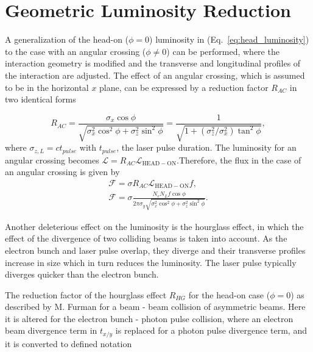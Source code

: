 \documentclass[../main.tex]{subfiles}
\begin{document}
\section{Geometric Luminosity Reduction}
\label{sec:geometric_luminosity_reduction}

A generalization of the head-on ($\phi = 0$) luminosity in (Eq.~\ref{eq:head_luminosity}) to the case with an angular crossing ($\phi \neq 0$) can be performed, where the interaction geometry is modified and the transverse and longitudinal profiles of the interaction are adjusted. The effect of an angular crossing, which is assumed to be in the horizontal $x$ plane, can be expressed by a reduction factor $R_{AC}$ in two identical forms \cite{suzuki1976general,miyahara2008luminosity}

\begin{equation}
R_{AC} = \frac{\sigma_{x}\cos\phi}{\sqrt{\sigma_{x}^{2}\cos^{2}\phi+\sigma_{z}^{2}\sin^{2}\phi}} = \frac{1}{\sqrt{1+\left(\sigma_{z}^{2}/\sigma_{x}^{2}\right)\tan^{2}\phi}},
\label{eq:angular_crossing_factor}    
\end{equation}
where $\sigma_{z,L} = ct_{pulse}$ with $t_{pulse}$, the laser pulse duration. The luminosity for an angular crossing becomes $\mathcal{L} = R_{AC}\mathcal{L}_{\mathrm{HEAD-ON}}$.Therefore, the flux in the case of an angular crossing is given by 
\begin{gather}
\mathcal{F} = \sigma R_{AC}\mathcal{L}_{\mathrm{HEAD-ON}}f, \\
\mathcal{F} = \sigma\frac{N_{e}N_{L}f\cos\phi}{2\pi\sigma_{y}\sqrt{\sigma_{x}^{2}\cos^{2}\phi + \sigma_{z}^{2}\sin^{2}\phi}}.
\label{eq:crossing_angle_flux}    
\end{gather}

Another deleterious effect on the luminosity is the hourglass effect, in which the effect of the divergence of two colliding beams is taken into account. As the electron bunch and laser pulse overlap, they diverge and their transverse profiles increase in size which in turn reduces the luminosity. The laser pulse typically diverges quicker than the electron bunch. 

The reduction factor of the hourglass effect $R_{HG}$ for the head-on case ($\phi = 0$) as described by M. Furman \cite{furman1991hourglass} for a beam - beam collision of asymmetric beams. Here it is altered for the electron bunch - photon pulse collision, where an electron beam divergence term in $t_{x/y}$ is replaced for a photon pulse divergence term, and it is converted to defined notation 
\end{document}
